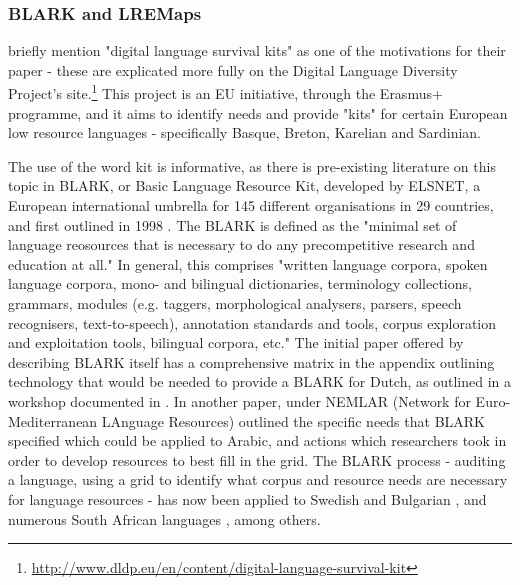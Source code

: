 
\subsubsection{BLARK and LREMaps}

\citet{soria2017digital} briefly mention "digital language survival kits" as one of the motivations for their paper - these are explicated more fully on the Digital Language Diversity Project's site.\footnote{\href{http://www.dldp.eu/en/content/digital-language-survival-kit}{http://www.dldp.eu/en/content/digital-language-survival-kit}} This project is an EU initiative, through the Erasmus+ programme, and it aims to identify needs and provide "kits" for certain European low resource languages - specifically Basque, Breton, Karelian and Sardinian.

The use of the word kit is informative, as there is pre-existing literature on this topic in BLARK, or Basic Language Resource Kit, developed by ELSNET, a European international umbrella for 145 different organisations in 29 countries, and first outlined in 1998 \citep{krauwer2003basic}. The BLARK is defined as the "minimal set of language reosources that is necessary to do any precompetitive research and education at all." \citep[4]{krauwer2003basic} In general, this comprises "written language corpora, spoken language corpora, mono- and bilingual dictionaries, terminology collections, grammars, modules (e.g. taggers, morphological analysers, parsers, speech recognisers, text-to-speech), annotation standards and tools, corpus exploration and exploitation tools, bilingual corpora, etc." The initial paper offered by \citet{krauwer2003basic} describing BLARK itself has a comprehensive matrix in the appendix outlining technology that would be needed to provide a BLARK for Dutch, as outlined in a workshop documented in \citet{binnenpoorte2002towards}. In another paper, \citet{maegaard2006blark} under NEMLAR (Network  for  Euro-Mediterranean  LAnguage  Resources) outlined the specific needs that BLARK specified which could be applied to Arabic, and actions which researchers took in order to develop resources to best fill in the grid. The BLARK process - auditing a language, using a grid to identify what corpus and resource needs are necessary for language resources - has now been applied to Swedish \citep{elenius2008language} and Bulgarian \citep{simov2004language}, and numerous South African languages \citep{grover2011south}, among others.

